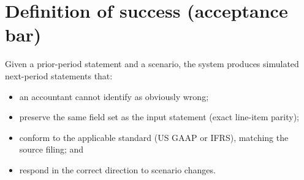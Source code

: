 \documentclass[11pt]{article}
\begin{document}
\section{Definition of success (acceptance bar)}
\label{sec:success}
Given a prior-period statement and a scenario, the system produces simulated next-period statements that:
\begin{itemize}
  \item an accountant cannot identify as obviously wrong;
  \item preserve the same field set as the input statement (exact line-item parity);
  \item conform to the applicable standard (US GAAP or IFRS), matching the source filing; and
  \item respond in the correct direction to scenario changes.
\end{itemize}
\end{document}
